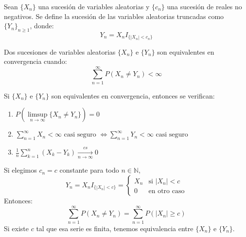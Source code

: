 \begin{definition}
    Sean $\{X_n\}$ una sucesión de variables aleatorias y $\{c_n\}$ una sucesión de reales no negativos.
    Se define la sucesión de las variables aleatorias truncadas como $\{Y_n\}_{n \geq 1}$, donde:
    $$Y_n = X_n I_{\{|X_n| < c_n\}}$$
\end{definition}

\begin{definition}
    Dos sucesiones de variables aleatorias $\{X_n\}$ e $\{Y_n\}$ son equivalentes en convergencia cuando:
    $$\sum_{n=1}^\infty P(X_n \neq Y_n) < \infty$$
\end{definition}

\begin{theorem}
    Si $\{X_n\}$ e $\{Y_n\}$ son equivalentes en convergencia, entonces se verifican:
    \begin{enumerate}
        \item $P(\limsup\limits_{n \to \infty} \{X_n \neq Y_n\}) = 0$
        \item $\sum_{n=1}^\infty X_n < \infty \text{ casi seguro } \Leftrightarrow \sum_{n=1}^\infty Y_n < \infty \text{ casi seguro}$
        \item $\frac{1}{n} \sum_{k=1}^n (X_k - Y_k) \xrightarrow[n \to \infty]{cs} 0$
    \end{enumerate}
\end{theorem}

\begin{remark}
    Si elegimos $c_n = c$ constante para todo $n \in \mathbb{N}$,
    $$Y_n = X_n I_{\{|X_n| < c\}} = \begin{cases}
            X_n & \text{si } |X_n| < c \\
            0   & \text{en otro caso}
        \end{cases}$$
    Entonces:
    $$\sum_{n=1}^\infty P(X_n \neq Y_n) = \sum_{n=1}^\infty P(|X_n| \geq c)$$
    Si existe $c$ tal que esa serie es finita, tenemos equivalencia entre $\{X_n\}$ e $\{Y_n\}$.
\end{remark}

